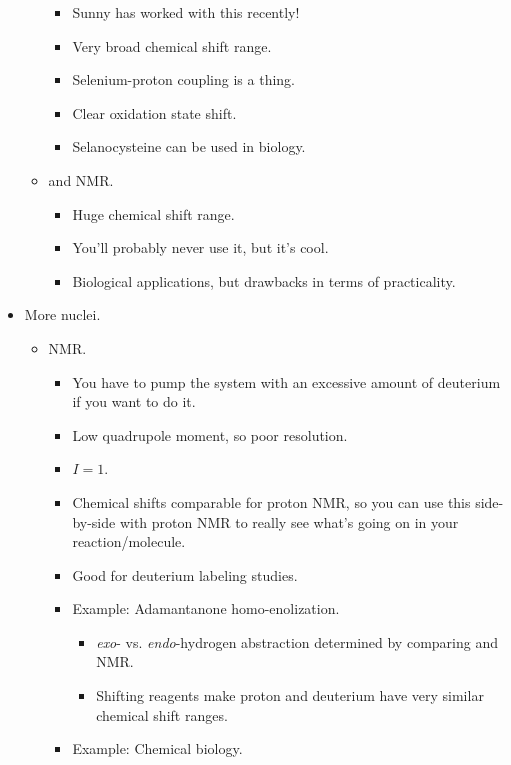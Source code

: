 \documentclass[../notes.tex]{subfiles}
\begin{document}
\begin{itemize}
\begin{itemize}
\begin{itemize}
            \item Sunny has worked with this recently!
            \item Very broad chemical shift range.
            \item Selenium-proton coupling is a thing.
            \item Clear oxidation state shift.
            \item Selanocysteine can be used in biology.
        \end{itemize}
        \item {} and  NMR.
        \begin{itemize}
            \item Huge chemical shift range.
            \item You'll probably never use it, but it's cool.
            \item Biological applications, but drawbacks in terms of practicality.
        \end{itemize}
    \end{itemize}
    \pagebreak
    \item More nuclei.
    \begin{itemize}
        \item {} NMR.
        \begin{itemize}
            \item You have to pump the system with an excessive amount of deuterium if you want to do it.
            \item Low quadrupole moment, so poor resolution.
            \item $I=1$.
            \item Chemical shifts comparable for proton NMR, so you can use this side-by-side with proton NMR to really see what's going on in your reaction/molecule.
            \item Good for deuterium labeling studies.
            \item Example: Adamantanone homo-enolization.
            \begin{itemize}
                \item \emph{exo}- vs. \emph{endo}-hydrogen abstraction determined by comparing  and  NMR.
                \item Shifting reagents make proton and deuterium have very similar chemical shift ranges.
            \end{itemize}
            \item Example: Chemical biology.

\end{itemize}
\end{itemize}
\end{itemize}
\end{document}
